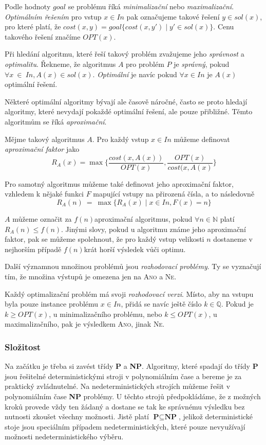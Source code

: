 \documentclass[
  biblatex,
  figures=false,
  glossaries,
  index
]{kidiplom}
\begin{document}
Podle hodnoty $goal$ se problému říká \textit{minimalizační} nebo \textit{maximalizační}. \textit{Optimálním řešením} pro vstup $x \in In$ pak označujeme takové řešení $y \in sol(x)$, pro které platí, že $cost(x, y) = goal\{cost(x, y') \mid y' \in sol(x)\}$. Cenu takového řešení značíme $OPT(x)$.

\sloppy Při hledání algoritmu, které řeší takový problém zvažujeme jeho \textit{správnost} a \textit{optimalitu}. Řekneme, že algoritmus $A$ pro problém $P$ je \textit{správný}, pokud $\forall x~\in~In, A(x) \in sol(x)$. \textit{Optimální} je navíc pokud $\forall x \in In$ je $A(x)$ optimální řešení.

\sloppy Některé optimální algoritmy bývají ale časově náročné, často se proto hledají algoritmy, které nevydají pokaždé optimální řešení, ale pouze přibližné. Těmto algoritmům se říká \textit{aproximační}.

Mějme takový algoritmus $A$. Pro každý vstup $x \in In$ můžeme definovat \textit{aproximační faktor} jako $$R_A(x) = \max\{\frac{cost(x, A(x))}{OPT(x)},\frac{OPT(x)}{cost(x, A(x)}\}$$

Pro samotný algoritmus můžeme také definovat jeho aproximační faktor, vzhledem k nějaké funkci $F$ mapující vstupy na přirozená čísla, a to následovně $$R_A(n)~=~\max\{R_A(x) \mid x \in In, F(x) = n\}$$

$A$ můžeme označit za $f(n)$\textendash aproximační algoritmus, pokud $\forall n \in \mathbb{N}$ platí $R_A(n) \le f(n)$. Jinými slovy, pokud u algoritmu známe jeho aproximační faktor, pak se můžeme spolehnout, že pro každý vstup velikosti $n$ dostaneme v nejhorším případě $f(n)$\textendash krát horší výsledek vůči optimu.
\newline

Další významnou množinou problémů jsou \textit{rozhodovací problémy}. Ty se vyznačují tím, že množina výstupů je omezena jen na \textsc{Ano} a \textsc{Ne}.

Každý optimalizační problém má svoji \textit{rozhodovací verzi}. Místo, aby na vstupu byla pouze instance problému $x \in In$, přidá se navíc ještě číslo $k \in \mathbb{Q}$. Pokud je $k \ge OPT(x)$, u minimalizačního problému, nebo $k \le OPT(x)$, u maximalizačního, pak je výsledkem  \textsc{Ano}, jinak \textsc{Ne}.

\subsubsection{Složitost}
Na začátku je třeba si zavést třídy \textbf{P} a \textbf{NP}. Algoritmy, které spadají do třídy \textbf{P} jsou řešitelné deterministickými stroji v polynomiálním čase a bereme je za praktický zvládnutelné. Na nedeterministických strojích můžeme řešit v polynomiálním čase \textbf{NP} problémy. U těchto strojů předpokládáme, že z možných kroků provede vždy ten žádaný a dostane se tak ke správnému výsledku bez nutnosti zkoušet všechny možnosti. Jistě platí $\textbf{P} \subseteq \textbf{NP}$, jelikož deterministické stoje jsou speciálním případem nedeterministických, které pouze nevyužívají možnosti nedeterministického výběru.
\end{document}
